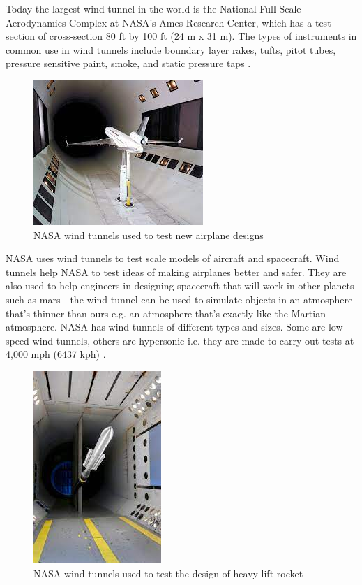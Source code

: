 Today the largest wind tunnel in the world is the National Full-Scale Aerodynamics Complex at NASA's Ames Research Center, which has a test section of cross-section 80 ft by 100 ft (24 m x 31 m). The types of instruments in common use in wind tunnels include boundary layer rakes, tufts, pitot tubes, pressure sensitive paint, smoke, and static pressure taps \cite{morris_force_2010}.
\begin{center}
\begin{figure}[!h]
	\centering
	\includegraphics{Figures/Fig3}
	\caption[NASA Wind Tunnels]{NASA wind tunnels used to test new airplane designs \cite{NASA}}
\end{figure}
\end{center}

NASA uses wind tunnels to test scale models of aircraft and spacecraft. Wind tunnels help NASA to test ideas of making airplanes better and safer. They are also used to help engineers in designing spacecraft that will work in other planets such as mars - the wind tunnel can be used to simulate objects in an atmosphere that's thinner than ours e.g. an atmosphere that's exactly like the Martian atmosphere. NASA has wind tunnels of different types and sizes. Some are low-speed wind tunnels, others are hypersonic i.e. they are made to carry out tests at 4,000 mph (6437 kph) \cite{NASA}.
\begin{center}
    \begin{figure}[!h]
\centering
\includegraphics{Figures/Fig4}
\caption[NASA Wind tunnel - space application]{NASA wind tunnels used to test the design of heavy-lift rocket \cite{NASA}}
\end{figure}
\end{center}
